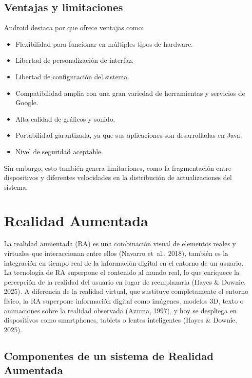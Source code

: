 \subsection{Ventajas y limitaciones}

Android destaca por que ofrece ventajas como:

\begin{itemize}
    \item Flexibilidad para funcionar en múltiples tipos de hardware.
    \item Libertad de personalización de interfaz.
    \item Libertad de configuración del sistema.
    \item Compatibilidad amplia con una gran variedad de herramientas y
    servicios de Google.
    \item Alta calidad de gráficos y sonido.
    \item Portabilidad garantizada, ya que sus aplicaciones son desarrolladas en
    Java.
    \item Nivel de seguridad aceptable.
\end{itemize}

Sin embargo, esto también genera limitaciones, como la fragmentación entre
dispositivos y diferentes velocidades en la distribución de actualizaciones del
sistema.

\section{Realidad Aumentada}
\label{sec:realidad-aumentada}

La realidad aumentada (RA) es una combinación visual de elementos reales y
virtuales que interaccionan entre ellos (Navarro et~al., 2018),
también es la integración en tiempo real de la información digital en el
entorno de un usuario. La tecnología de RA superpone el contenido al mundo
real, lo que enriquece la percepción de la realidad del usuario en lugar de
reemplazarla (Hayes \& Downie, 2025). A diferencia de la realidad virtual, que
sustituye completamente el entorno físico, la RA superpone información digital
como imágenes, modelos 3D, texto o animaciones sobre la realidad observada
(Azuma, 1997), y hoy se despliega en dispositivos como smartphones, tablets o
lentes inteligentes (Hayes \& Downie, 2025).

\subsection{Componentes de un sistema de Realidad Aumentada}

